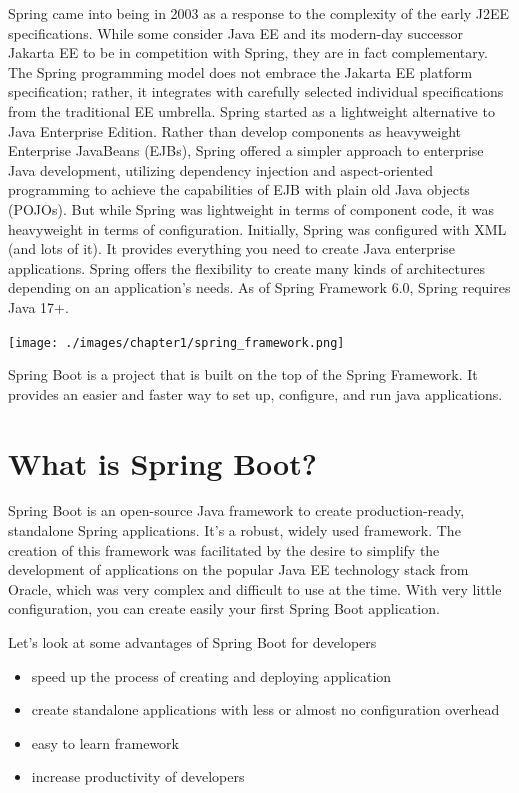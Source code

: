 \documentclass[a4paper, 12pt]{report}
\begin{document}
Spring came into being in 2003 as a response to the complexity of the early J2EE specifications. While some consider Java EE and its modern-day successor Jakarta EE to be in competition with Spring, they are in fact complementary. The Spring programming model does not embrace the Jakarta EE platform specification; rather, it integrates with carefully selected individual specifications from the traditional EE umbrella. Spring started as a lightweight alternative to Java Enterprise Edition. Rather than develop components as heavyweight Enterprise
JavaBeans (EJBs), Spring offered a simpler approach to enterprise Java development, utilizing dependency injection and aspect-oriented programming to achieve the capabilities of EJB with plain old Java objects (POJOs).
But while Spring was lightweight in terms of component code, it was heavyweight in terms of configuration. Initially, Spring was configured with XML (and lots of it).
It provides everything you need to create Java enterprise applications. Spring offers the flexibility to create many kinds of architectures depending on an application’s needs. As of Spring Framework 6.0, Spring requires Java 17+.

\texttt{[image: ./images/chapter1/spring\_framework.png]} 

Spring Boot is a project that is built on the top of the Spring Framework. It provides an easier and faster way to set up, configure, and run java applications.

    
\section{What is Spring Boot?}
 
Spring Boot is an open-source Java framework to create production-ready,  standalone Spring applications. It's a robust, widely used framework. The creation of this framework was facilitated by the desire to simplify the development of applications on the popular Java EE technology stack from Oracle, which was very complex and difficult to use at the time. With very little configuration, you can create easily your first Spring Boot application.

Let's look at some advantages of Spring Boot for developers 
\begin{itemize}
\item speed up the process of creating and deploying application
\item create standalone applications with less or almost no configuration overhead
\item easy to learn framework
\item increase productivity of developers
\end{itemize}
\end{document}
